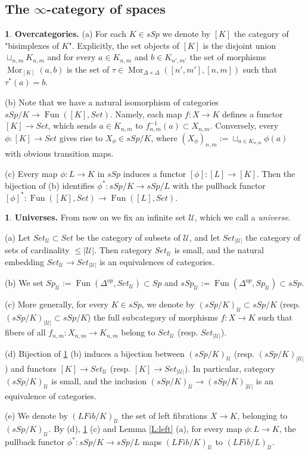 \documentclass[12pt]{amsart}
\theoremstyle{plain}
\theoremstyle{definition}
\newtheorem{Emp}[Thm]{}
\numberwithin{equation}{section}
\newcommand{\cal}[1]{\mathcal{#1}}
\newcommand{\C}[1]{\cal#1}
\newcommand{\Dt}{\Delta}
\newcommand{\rl}[1]{Lemma \ref{L:#1}}
\newcommand{\re}[1]{\ref{E:#1}}
\newcommand{\Fun}{\operatorname{Fun}}
\newcommand{\Mor}{\operatorname{Mor}}
\begin{document}
\subsection{The $\infty$-category of spaces}

\begin{Emp} \label{E:overcat}
{\bf Overcategories.} (a) For each $K\in sSp$ we denote by $[K]$
the category of "bisimplexes of $K$". Explicitly, the set objects
of $[K]$ is the disjoint union $\sqcup_{n,m} K_{n,m}$ and for
every $a\in K_{n,m}$ and $b\in K_{n',m'}$ the set of morphisms
$\Mor_{[K]}(a,b)$ is the set of 
$\tau\in\Mor_{\Dt\times\Dt}([n',m'],[n,m])$ such that
$\tau^*(a)=b$.

(b) Note that we have a natural isomorphism of categories
$sSp/K\to \Fun([K],Set)$. Namely, each map $f:X\to K$ defines 
a functor $[K]\to Set$, which sends $a\in K_{n,m}$ to $f^{-1}_{n,m}(a)\subset
X_{n,m}$. Conversely, every $\phi:[K]\to Set$ gives rise to
$X_{\phi}\in sSp/K$, where $(X_{\phi})_{n,m}:=\sqcup_{a\in
K_{n,m}} \phi(a)$ with obvious transition maps.

(c) Every map $\phi:L\to K$ in $sSp$ induces a functor
$[\phi]:[L]\to[K]$. Then the bijection of (b) identifies
$\phi^*:sSp/K\to sSp/L$ with the pullback functor
 $[\phi]^*:\Fun([K],Set)\to\Fun([L],Set)$.
\end{Emp}


\begin{Emp} \label{E:universes}
{\bf Universes.} From now on we fix an infinite set $\C{U}$, which
we call a {\em universe}.

(a) Let $Set_{\C{U}}\subset Set$ be the category of subsets of
$\C{U}$, and let $Set_{|\C{U}|}$ the category of sets of
cardinality $\leq |\C{U}|$. Then category $Set_{\C{U}}$ is small,
and the natural embedding $Set_{\C{U}}\to Set_{|\C{U}|}$ is an
equivalences of categories.

(b) We set $Sp_{\C{U}}:=\Fun(\Dt^{op},Set_{\C{U}})\subset Sp$ and
$sSp_{\C{U}}:=\Fun(\Dt^{op},Sp_{\C{U}})\subset sSp$.

(c) More generally, for every $K\in sSp$, we denote by
$(sSp/K)_{\C{U}}\subset sSp/K$ (resp. $(sSp/K)_{|\C{U}|}\subset
sSp/K$) the full subcategory of morphisms $f:X\to K$ such that
fibers of all $f_{n,m}:X_{n,m}\to K_{n,m}$ belong to $Set_{\C{U}}$
(resp. $Set_{|\C{U}|}$).

(d) Bijection of \re{overcat} (b) induces a bijection between
$(sSp/K)_{\C{U}}$ (resp.  $(sSp/K)_{|\C{U}|}$) and functors
$[K]\to Set_{\C{U}}$ (resp. $[K]\to Set_{|\C{U}|}$). In
particular, category $(sSp/K)_{\C{U}}$ is small, and the inclusion 
$(sSp/K)_{\C{U}}\to (sSp/K)_{|\C{U}|}$ is an equivalence
of categories.

(e) We denote by $(LFib/K)_{\C{U}}$ the set of left fibrations $X\to
K$, belonging to $(sSp/K)_{\C{U}}$. By (d), \re{overcat}
(c) and \rl{left} (a), for every map $\phi:L\to K$, the pullback
functor $\phi^*:sSp/K\to sSp/L$ maps $(LFib/K)_{\C{U}}$ to
$(LFib/L)_{\C{U}}$.
\end{Emp}
\end{document}
